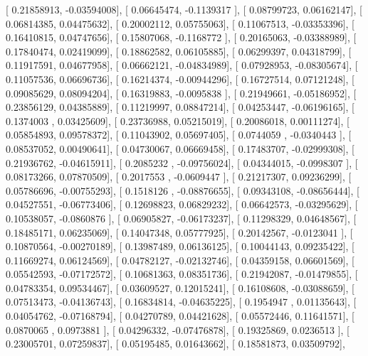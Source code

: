 \documentclass{article}
\begin{document}
       [ 0.21858913, -0.03594008],
       [ 0.06645474, -0.1139317 ],
       [ 0.08799723,  0.06162147],
       [ 0.06814385,  0.04475632],
       [ 0.20002112,  0.05755063],
       [ 0.11067513, -0.03353396],
       [ 0.16410815,  0.04747656],
       [ 0.15807068, -0.1168772 ],
       [ 0.20165063, -0.03388989],
       [ 0.17840474,  0.02419099],
       [ 0.18862582,  0.06105885],
       [ 0.06299397,  0.04318799],
       [ 0.11917591,  0.04677958],
       [ 0.06662121, -0.04834989],
       [ 0.07928953, -0.08305674],
       [ 0.11057536,  0.06696736],
       [ 0.16214374, -0.00944296],
       [ 0.16727514,  0.07121248],
       [ 0.09085629,  0.08094204],
       [ 0.16319883, -0.0095838 ],
       [ 0.21949661, -0.05186952],
       [ 0.23856129,  0.04385889],
       [ 0.11219997,  0.08847214],
       [ 0.04253447, -0.06196165],
       [ 0.1374003 ,  0.03425609],
       [ 0.23736988,  0.05215019],
       [ 0.20086018,  0.00111274],
       [ 0.05854893,  0.09578372],
       [ 0.11043902,  0.05697405],
       [ 0.0744059 , -0.0340443 ],
       [ 0.08537052,  0.00490641],
       [ 0.04730067,  0.06669458],
       [ 0.17483707, -0.02999308],
       [ 0.21936762, -0.04615911],
       [ 0.2085232 , -0.09756024],
       [ 0.04344015, -0.0998307 ],
       [ 0.08173266,  0.07870509],
       [ 0.2017553 , -0.0609447 ],
       [ 0.21217307,  0.09236299],
       [ 0.05786696, -0.00755293],
       [ 0.1518126 , -0.08876655],
       [ 0.09343108, -0.08656444],
       [ 0.04527551, -0.06773406],
       [ 0.12698823,  0.06829232],
       [ 0.06642573, -0.03295629],
       [ 0.10538057, -0.0860876 ],
       [ 0.06905827, -0.06173237],
       [ 0.11298329,  0.04648567],
       [ 0.18485171,  0.06235069],
       [ 0.14047348,  0.05777925],
       [ 0.20142567, -0.0123041 ],
       [ 0.10870564, -0.00270189],
       [ 0.13987489,  0.06136125],
       [ 0.10044143,  0.09235422],
       [ 0.11669274,  0.06124569],
       [ 0.04782127, -0.02132746],
       [ 0.04359158,  0.06601569],
       [ 0.05542593, -0.07172572],
       [ 0.10681363,  0.08351736],
       [ 0.21942087, -0.01479855],
       [ 0.04783354,  0.09534467],
       [ 0.03609527,  0.12015241],
       [ 0.16108608, -0.03088659],
       [ 0.07513473, -0.04136743],
       [ 0.16834814, -0.04635225],
       [ 0.1954947 ,  0.01135643],
       [ 0.04054762, -0.07168794],
       [ 0.04270789,  0.04421628],
       [ 0.05572446,  0.11641571],
       [ 0.0870065 ,  0.0973881 ],
       [ 0.04296332, -0.07476878],
       [ 0.19325869,  0.0236513 ],
       [ 0.23005701,  0.07259837],
       [ 0.05195485,  0.01643662],
       [ 0.18581873,  0.03509792],
\end{document}
